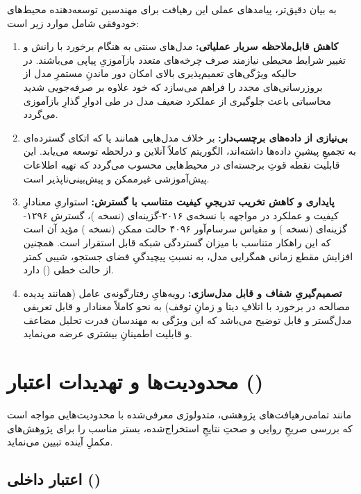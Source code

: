\documentclass[oneside,openany,phd]{TMU-Thesis}
\begin{document}
به بیان دقیق‌تر، پیامدهای عملی این رهیافت برای مهندسین توسعه‌دهنده محیط‌های خودوفقی شامل موارد زیر است:

\begin{enumerate}
    \item \textbf{کاهش قابل‌ملاحظه سربار عملیاتی:} مدل‌های سنتی به هنگام برخورد با رانش و تغییر شرایط محیطی نیازمند صرف چرخه‌های متعدد بازآموزیِ پیاپی می‌باشند. در حالیکه ویژگی‌های تعمیم‌پذیری بالای  امکان دور ماندنِ مستمرِ مدل از بروزرسانی‌های مجدد را فراهم می‌سازد که خود علاوه بر صرفه‌جویی شدید محاسباتی باعث جلوگیری از عملکرد ضعیف مدل در طی ادوارِ گذارِ بازآموزی می‌گردد.
    \item \textbf{بی‌نیازی از داده‌های برچسب‌دار:} بر خلاف مدل‌هایی همانند  یا  که اتکای گسترده‌ای به تجمیعِ پیشینِ داده‌ها داشته‌اند، الگوریتم  کاملاً آنلاین و درلحظه توسعه می‌یابد. این قابلیت نقطه قوتِ برجسته‌ای در محیط‌هایی محسوب می‌گردد که تهیه اطلاعات پیش‌آموزشی غیرممکن و پیش‌بینی‌ناپذیر است.
    \item \textbf{پایداری و کاهش تخریب تدریجیِ کیفیت متناسب با گسترش:} استواریِ معنادارِ کیفیت و عملکرد در مواجهه با نسخه‌ی ۲۰۱۶-گزینه‌ای (نسخه )، گسترش ۱۲۹۶-گزینه‌ای (نسخه ) و مقیاس سرسام‌آور ۴۰۹۶ حالت ممکن (نسخه ) مؤید آن است که این راهکار متناسب با میزان گستردگی شبکه قابل استقرار است. همچنین افزایش مقطع زمانی همگرایی مدل، به نسبتِ پیچیدگیِ فضای جستجو، شیبی کمتر از حالت خطی () دارد.
    \item \textbf{تصمیم‌گیریِ شفاف و قابل مدل‌سازی:} رویه‌هایِ رفتارگونه‌ی عامل (همانند پدیده مصالحه در برخورد با اتلافِ دیتا و زمانِ توقف) به نحو کاملاً معنا‌دار و قابل تعریفی مدل‌گستر و قابل توضیح می‌باشد که این ویژگی به مهندسان قدرت تحلیل مضاعف و قابلیت اطمینانِ بیشتری عرضه می‌نماید.
\end{enumerate}

\section{محدودیت‌ها و تهدیدات اعتبار ()}

مانند تمامی‌رهیافت‌های پژوهشی، متدولوژی معرفی‌شده با محدودیت‌هایی مواجه است که بررسی صریحِ روایی و صحتِ نتایجِ استخراج‌شده، بستر مناسب را برای پژوهش‌های مکملِ آینده تبیین می‌نماید.

\subsection{اعتبار داخلی ()}
\end{document}
